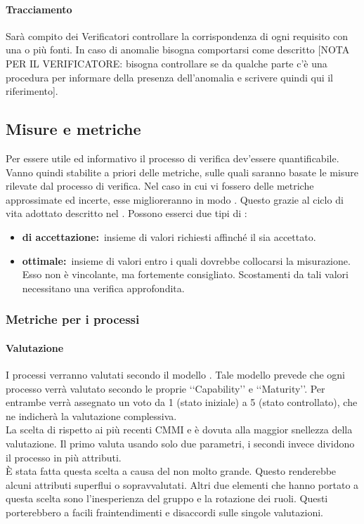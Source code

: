 			\paragraph{Tracciamento}
				Sarà compito dei Verificatori controllare la corrispondenza di ogni requisito con una o più fonti. In caso di anomalie bisogna comportarsi come descritto [NOTA PER IL VERIFICATORE: bisogna controllare se da qualche parte c'è una procedura per informare della presenza dell'anomalia e scrivere quindi qui il riferimento].
	\subsection{Misure e metriche}
		\label{sec:3.7}
		Per essere utile ed informativo il processo di verifica dev'essere quantificabile. Vanno quindi stabilite a priori delle metriche, sulle quali saranno basate le misure rilevate dal processo di verifica. Nel caso in cui vi fossero delle metriche approssimate ed incerte, esse miglioreranno in modo . Questo grazie al ciclo di vita adottato descritto nel \PPdoc. Possono esserci due tipi di :
		\begin{itemize}
			\item \textbf{ di accettazione:}\ insieme di valori richiesti affinché il  sia accettato.
			\item \textbf{ ottimale:}\ insieme di valori entro i quali dovrebbe collocarsi la misurazione. Esso non è vincolante, ma fortemente consigliato. Scostamenti da tali valori necessitano una verifica approfondita.
		\end{itemize}
		\subsubsection{Metriche per i processi}
			\label{sec:3.7.1}
			\paragraph{Valutazione }
				\label{sec:3.7.1.1}
				I processi verranno valutati secondo il modello . Tale modello prevede che ogni processo verrà valutato secondo le proprie ‘‘Capability’’ e ‘‘Maturity’’. Per entrambe verrà assegnato un voto da 1 (stato iniziale) a 5 (stato controllato), che ne indicherà la valutazione complessiva. \\
				La scelta di  rispetto ai più recenti CMMI e  è dovuta alla maggior snellezza della valutazione. Il primo valuta usando solo due parametri, i secondi invece dividono il processo in più attributi. \\
				È stata fatta questa scelta a causa del  non molto grande. Questo renderebbe alcuni attributi superflui o sopravvalutati. Altri due elementi che hanno portato a questa scelta sono l'inesperienza del gruppo e la rotazione dei ruoli. Questi porterebbero a facili fraintendimenti e disaccordi sulle singole valutazioni.
				
